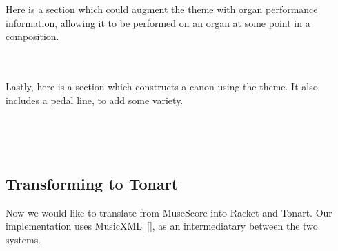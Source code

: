 \documentclass[10pt, sigplan]{acmart}
\let\SOriginalthesubsubsection\thesubsubsection
\newcommand{\Ssubsection}[2]{\subsection[#1]{#2}\let\thesubsubsection\SOriginalthesubsubsection}
\newcommand{\AutobibLink}[1]{\color{ACMPurple}{#1}}
\newcommand{\Autobibref}[1]{#1}
\providecommand{\AutobibLink}[1]{#1}
\begin{document}
Here is a section which could augment the theme with organ performance information,
allowing it to be performed on an organ at some point in a composition.

\hspace*{\fill}\\
\hspace*{\fill}\\

Lastly, here is a section which constructs a canon using the theme.  It also
includes a pedal line, to add some variety.

\hspace*{\fill}\\

\hspace*{\fill}\\

\Ssubsection{Transforming to Tonart}{Transforming to Tonart}\label{t:x28part_x22Transformingx5ftox5fTonartx22x29}

Now we would like to translate from MuseScore into Racket and Tonart.  Our
implementation uses MusicXML\Autobibref{~[\hyperref[t:x28autobib_x22Goodx2c_MichaelMusicXMLx3a_An_Internetx2dFriendly_Format_for_Notation_InterchangeIn_Procx2e_Proceedings_of_XML2001httpsx3ax2fx2fwwwx2emusicxmlx2ecomx2fforx2ddevelopersx2fx22x29]{\AutobibLink{5}}]}, as an intermediatary between
the two systems.
\end{document}
